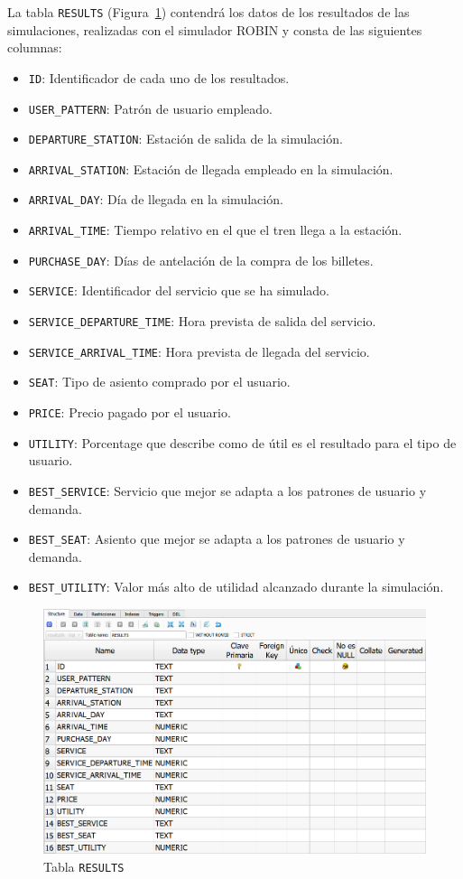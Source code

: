 La tabla \texttt{RESULTS} (Figura~\ref{fig:dbResultsRESULTS}) contendrá los datos de los resultados de las simulaciones, realizadas con el simulador \acrshort{ROBIN} y consta de las siguientes columnas:
\begin{itemize}
    \item \texttt{ID}: Identificador de cada uno de los resultados.
    \item \texttt{USER\_PATTERN}: Patrón de usuario empleado.
    \item \texttt{DEPARTURE\_STATION}: Estación de salida de la simulación.
    \item \texttt{ARRIVAL\_STATION}: Estación de llegada empleado en la simulación.
    \item \texttt{ARRIVAL\_DAY}: Día de llegada en la simulación.
    \item \texttt{ARRIVAL\_TIME}: Tiempo relativo en el que el tren llega a la estación.
    \item \texttt{PURCHASE\_DAY}: Días de antelación de la compra de los billetes.
    \item \texttt{SERVICE}: Identificador del servicio que se ha simulado.
    \item \texttt{SERVICE\_DEPARTURE\_TIME}: Hora prevista de salida del servicio.
    \item \texttt{SERVICE\_ARRIVAL\_TIME}: Hora prevista de llegada del servicio.
    \item \texttt{SEAT}: Tipo de asiento comprado por el usuario.
    \item \texttt{PRICE}: Precio pagado por el usuario.
    \item \texttt{UTILITY}: Porcentage que describe como de útil es el resultado para el tipo de usuario.
    \item \texttt{BEST\_SERVICE}: Servicio que mejor se adapta a los patrones de usuario y demanda.
    \item \texttt{BEST\_SEAT}: Asiento que mejor se adapta a los patrones de usuario y demanda.
    \item \texttt{BEST\_UTILITY}: Valor más alto de utilidad alcanzado durante la simulación.
\end{itemize}

\begin{figure}[H]
\centering
\includegraphics[width=.9\textwidth]{fig/Tablas base de datos/Resultados/RESULTS.png}
\caption{Tabla \texttt{RESULTS}}
\label{fig:dbResultsRESULTS}
\end{figure}

